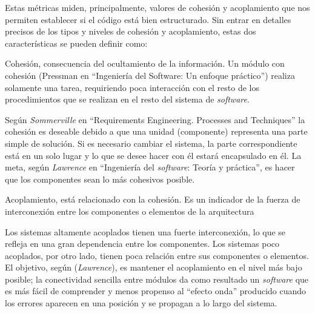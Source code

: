 Estas métricas miden, principalmente, valores de cohesión y acoplamiento que nos permiten establecer si el código está bien estructurado. 
Sin entrar en detalles precisos de los tipos y niveles de cohesión y acoplamiento, estas dos características se pueden definir como:

\begin{definition}
Cohesión, consecuencia del ocultamiento de la información. Un módulo con
cohesión (Pressman en ``Ingeniería del Software: Un enfoque práctico'')
realiza solamente una tarea, requiriendo poca
interacción con el resto de los procedimientos que se realizan en el resto del
sistema de \textit{software}. 
\end{definition}

Según \textit{Sommerville} en ``Requirements Engineering. Processes and Techniques'' la cohesión es deseable
debido a que una unidad (componente) representa una parte
simple de solución. Si es necesario cambiar el sistema, la parte
correspondiente está en un solo lugar y lo que se desee hacer con
él estará encapsulado en él. La meta, según
\textit{Lawrence} en ``Ingeniería del \textit{software}: Teoría y práctica'', es hacer que los componentes sean lo más cohesivos posible.


\begin{definition}
Acoplamiento, está relacionado con la cohesión. Es un
indicador de la fuerza de interconexión entre los componentes o
elementos de la arquitectura 
\end{definition}

Los sistemas altamente acoplados tienen una fuerte interconexión, lo que se
refleja en una gran dependencia entre los componentes. Los
sistemas poco acoplados, por otro lado, tienen poca relación entre
sus componentes o elementos. El objetivo, según (\textit{Lawrence}), es mantener el
acoplamiento en el nivel más bajo posible; la conectividad sencilla entre
módulos da como resultado un \textit{software} que es más fácil de comprender y menos
propenso al ``efecto onda'' producido cuando los errores aparecen en una
posición y se propagan a lo largo del sistema. 



